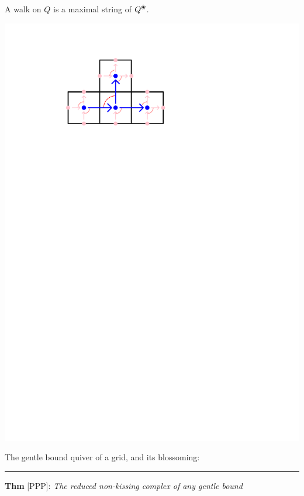 \documentclass[portrait,final,a0paper,fontscale=0.25]{baposter}
\newcommand{\blossom}{^\text{\ding{96}}} %
\theoremstyle{definition}
\begin{document}
\begin{poster}
{A {\color{green} walk} on $Q$ is a maximal string of $Q\blossom$.

\vspace*{-.6cm}\hspace*{6cm}\includegraphics[scale=.4]{BlossomingQuiverGrid}

\vspace*{-1cm}
\begin{minipage}{5.5cm}
 The gentle bound quiver of a grid, and its blossoming: 
\end{minipage}

\vspace{.15cm}
\hspace{-.25cm}
{\color{green} \rule{10.02cm}{1pt}}
\vspace{-.35cm}

\medskip
{\color{green} \bf Thm} [PPP]: {\it The reduced non-kissing complex of any gentle bound} 
\hspace*{1.95cm}{\it quiver is pure and thin.}

}
\end{poster}
\end{document}
